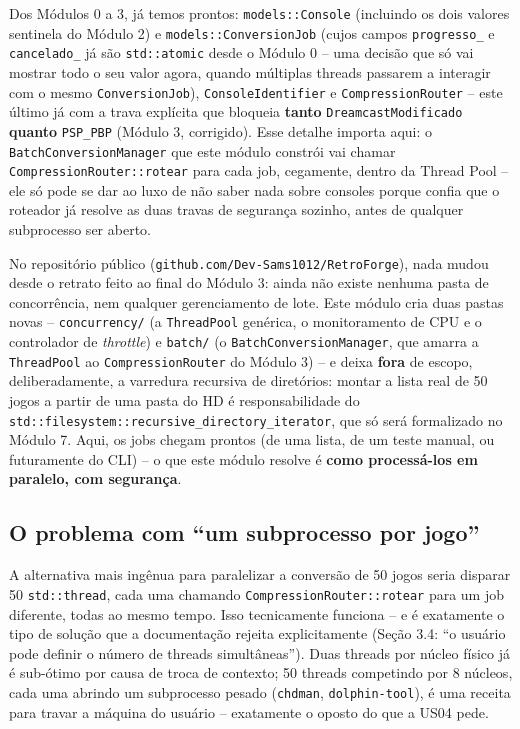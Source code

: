 \begin{CaixaInfo}[title={O que já existe vs. o que este módulo constrói}]
Dos Módulos 0 a 3, já temos prontos: \texttt{models::Console} (incluindo os dois valores sentinela do Módulo 2) e \texttt{models::ConversionJob} (cujos campos \texttt{progresso\_} e \texttt{cancelado\_} já são \texttt{std::atomic} desde o Módulo 0 -- uma decisão que só vai mostrar todo o seu valor agora, quando múltiplas threads passarem a interagir com o mesmo \texttt{ConversionJob}), \texttt{ConsoleIdentifier} e \texttt{CompressionRouter} -- este último já com a trava explícita que bloqueia \textbf{tanto} \texttt{DreamcastModificado} \textbf{quanto} \texttt{PSP\_PBP} (Módulo 3, corrigido). Esse detalhe importa aqui: o \texttt{BatchConversionManager} que este módulo constrói vai chamar \texttt{CompressionRouter::rotear} para cada job, cegamente, dentro da Thread Pool -- ele só pode se dar ao luxo de não saber nada sobre consoles porque confia que o roteador já resolve as duas travas de segurança sozinho, antes de qualquer subprocesso ser aberto.

No repositório público (\texttt{github.com/Dev-Sams1012/RetroForge}), nada mudou desde o retrato feito ao final do Módulo 3: ainda não existe nenhuma pasta de concorrência, nem qualquer gerenciamento de lote. Este módulo cria duas pastas novas -- \texttt{concurrency/} (a \texttt{ThreadPool} genérica, o monitoramento de CPU e o controlador de \textit{throttle}) e \texttt{batch/} (o \texttt{BatchConversionManager}, que amarra a \texttt{ThreadPool} ao \texttt{CompressionRouter} do Módulo 3) -- e deixa \textbf{fora} de escopo, deliberadamente, a varredura recursiva de diretórios: montar a lista real de 50 jogos a partir de uma pasta do HD é responsabilidade do \texttt{std::filesystem::recursive\_directory\_iterator}, que só será formalizado no Módulo 7. Aqui, os jobs chegam prontos (de uma lista, de um teste manual, ou futuramente do CLI) -- o que este módulo resolve é \textbf{como processá-los em paralelo, com segurança}.
\end{CaixaInfo}

\subsection{O problema com ``um subprocesso por jogo''}

A alternativa mais ingênua para paralelizar a conversão de 50 jogos seria disparar 50 \texttt{std::thread}, cada uma chamando \texttt{CompressionRouter::rotear} para um job diferente, todas ao mesmo tempo. Isso tecnicamente funciona -- e é exatamente o tipo de solução que a documentação rejeita explicitamente (Seção 3.4: ``o usuário pode definir o número de threads simultâneas''). Duas threads por núcleo físico já é sub-ótimo por causa de troca de contexto; 50 threads competindo por 8 núcleos, cada uma abrindo um subprocesso pesado (\texttt{chdman}, \texttt{dolphin-tool}), é uma receita para travar a máquina do usuário -- exatamente o oposto do que a US04 pede.

